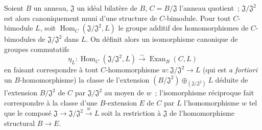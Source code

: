 \begin{proposition}[18.3.8]
\label{0.18.3.8-fr}
Soient $B$ un anneau, $\mathfrak J$ un idéal bilatère de $B$,
$C=B/\mathfrak J$ l'anneau quotient~; $\mathfrak J/\mathfrak J^2$ est alors
canoniquement muni d'une structure de $C$-bimodule. Pour tout $C$-bimodule
$L$, soit $\operatorname{Hom}_C(\mathfrak J/\mathfrak J^2,L)$ le groupe
additif des homomorphismes de $C$-bimodules de $\mathfrak J/\mathfrak J^2$
dans $L$. On définit alors un \textup{isomorphisme} canonique de groupes commutatifs
\begin{equation}
\label{0.18.3.8.1-fr}
\tag{18.3.8.1}
  \eta_L:\operatorname{Hom}_C(\mathfrak J/\mathfrak J^2,L)
  \xrightarrow{\sim}\operatorname{Exan}_B(C,L)
\end{equation}
en faisant correspondre à tout $C$-homomorphisme
$w:\mathfrak J/\mathfrak J^2\to L$ \textup{(qui est \emph{a fortiori} un
$B$-homomorphisme)} la classe de l'extension
$(B/\mathfrak J^2)\oplus_{(\mathfrak J/\mathfrak J^2)}L$ déduite de
l'extension $B/\mathfrak J^2$ de $C$ par $\mathfrak J/\mathfrak J^2$ au moyen
de $w$~; l'isomorphisme réciproque fait correspondre à la classe d'une
$B$-extension $E$ de $C$ par $L$ l'homomorphisme $w$ tel que le composé
$\mathfrak J\to\mathfrak J/\mathfrak J^2\xrightarrow{w}L$ soit la restriction
à $\mathfrak J$ de l'homomorphisme structural $B\to E$.
\end{proposition}

